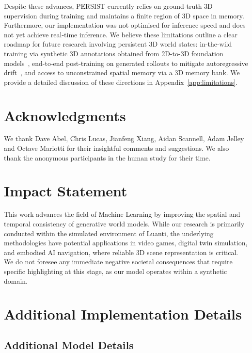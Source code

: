 \documentclass{article}
\theoremstyle{plain}
\theoremstyle{definition}
\theoremstyle{remark}
\begin{document}
Despite these advances, PERSIST currently relies on ground-truth 3D supervision during training and maintains a finite region of 3D space in memory. Furthermore, our implementation was not optimised for inference speed and does not yet achieve real-time inference. We believe these limitations outline a clear roadmap for future research involving persistent 3D world states: in-the-wild training via synthetic 3D annotations obtained from 2D-to-3D foundation models~\citep{wang2025vggt,sam3dteam2025sam3d3dfyimages}, end-to-end post-training on generated rollouts to mitigate autoregressive drift~\citep{huang2025self}, and access to unconstrained spatial memory via a 3D memory bank. We provide a detailed discussion of these directions in Appendix~\ref{app:limitations}.

\clearpage
\section*{Acknowledgments}
We thank Dave Abel, Chris Lucas, Jianfeng Xiang, Aidan Scannell, Adam Jelley and Octave Mariotti for their insightful comments and suggestions. We also thank the anonymous participants in the human study for their time.

\section*{Impact Statement}

This work advances the field of Machine Learning by improving the spatial and temporal consistency of generative world models.
While our research is primarily conducted within the simulated environment of Luanti, the underlying methodologies have potential applications in video games, digital twin simulation, and embodied AI navigation, where reliable 3D scene representation is critical.
We do not foresee any immediate negative societal consequences that require specific highlighting at this stage, as our model operates within a synthetic domain.


  


\newpage
\appendix
{}
\onecolumn

\section{Additional Implementation Details}\label{app:implt}


\subsection{Additional Model Details}
\end{document}
